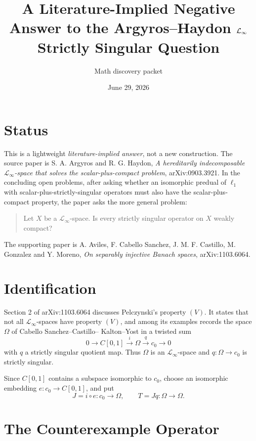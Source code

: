 \documentclass[11pt]{article}
\title{A Literature-Implied Negative Answer to the Argyros--Haydon \(\Linf\) Strictly Singular Question}
\author{Math discovery packet}
\date{June 29, 2026}
\newcommand{\cnull}{c_0}
\newcommand{\Linf}{\mathcal L_\infty}
\begin{document}
\maketitle

\section{Status}

This is a lightweight \emph{literature-implied answer}, not a new
construction.  The source paper is S. A. Argyros and R. G. Haydon,
\emph{A hereditarily indecomposable \(\Linf\)-space that solves the
scalar-plus-compact problem}, arXiv:0903.3921.
In the concluding open problems, after asking whether an isomorphic predual of
\(\ell_1\) with scalar-plus-strictly-singular operators must also have the
scalar-plus-compact property, the paper asks the more general problem:
\begin{quote}
Let \(X\) be a \(\Linf\)-space. Is every strictly singular operator on \(X\)
weakly compact?
\end{quote}

The supporting paper is A. Aviles, F. Cabello Sanchez, J. M. F. Castillo,
M. Gonzalez and Y. Moreno, \emph{On separably injective Banach spaces},
arXiv:1103.6064.

\section{Identification}

Section 2 of arXiv:1103.6064 discusses Pelczynski's property \((V)\).  It
states that not all \(\mathcal L_\infty\)-spaces have property \((V)\), and
among its examples records the space \(\Omega\) of Cabello Sanchez--Castillo--
Kalton--Yost in a twisted sum
\[
  0 \longrightarrow C[0,1] \stackrel{i}{\longrightarrow} \Omega
    \stackrel{q}{\longrightarrow} \cnull \longrightarrow 0
\]
with \(q\) a strictly singular quotient map.  Thus \(\Omega\) is an
\(\mathcal L_\infty\)-space and \(q:\Omega\to\cnull\) is strictly singular.

Since \(C[0,1]\) contains a subspace isomorphic to \(\cnull\), choose an
isomorphic embedding \(e:\cnull\to C[0,1]\), and put
\[
  J=i\circ e:\cnull\to\Omega,\qquad T=Jq:\Omega\to\Omega .
\]

\section{The Counterexample Operator}
\end{document}
